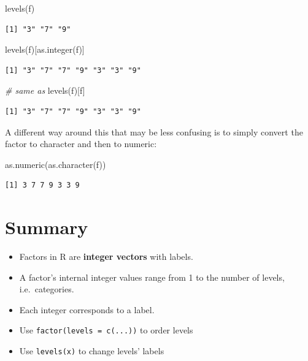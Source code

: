 \documentclass[
]{book}
\newenvironment{Shaded}{\begin{snugshade}}{\end{snugshade}}
\newcommand{\CommentTok}[1]{\textcolor[rgb]{0.56,0.35,0.01}{\textit{#1}}}
\newcommand{\FunctionTok}[1]{\textcolor[rgb]{0.00,0.00,0.00}{#1}}
\newcommand{\NormalTok}[1]{#1}
\begin{document}
\begin{Shaded}
\begin{Highlighting}[]
\FunctionTok{levels}\NormalTok{(f)}
\end{Highlighting}
\end{Shaded}

\begin{verbatim}
[1] "3" "7" "9"
\end{verbatim}

\begin{Shaded}
\begin{Highlighting}[]
\FunctionTok{levels}\NormalTok{(f)[}\FunctionTok{as.integer}\NormalTok{(f)]}
\end{Highlighting}
\end{Shaded}

\begin{verbatim}
[1] "3" "7" "7" "9" "3" "3" "9"
\end{verbatim}

\begin{Shaded}
\begin{Highlighting}[]
\CommentTok{\# same as}
\FunctionTok{levels}\NormalTok{(f)[f]}
\end{Highlighting}
\end{Shaded}

\begin{verbatim}
[1] "3" "7" "7" "9" "3" "3" "9"
\end{verbatim}

A different way around this that may be less confusing is to simply convert the factor to character and then to numeric:

\begin{Shaded}
\begin{Highlighting}[]
\FunctionTok{as.numeric}\NormalTok{(}\FunctionTok{as.character}\NormalTok{(f))}
\end{Highlighting}
\end{Shaded}

\begin{verbatim}
[1] 3 7 7 9 3 3 9
\end{verbatim}

\hypertarget{summary}{%
\section{Summary}\label{summary}}

\begin{rmdnote}
\begin{itemize}
\item
  Factors in R are \textbf{integer vectors} with labels.
\item
  A factor's internal integer values range from 1 to the number of
  levels, i.e.~categories.
\item
  Each integer corresponds to a label.
\item
  Use \texttt{factor(levels\ =\ c(...))} to order levels
\item
  Use \texttt{levels(x)} to change levels' labels
\end{itemize}
\end{rmdnote}
\end{document}

